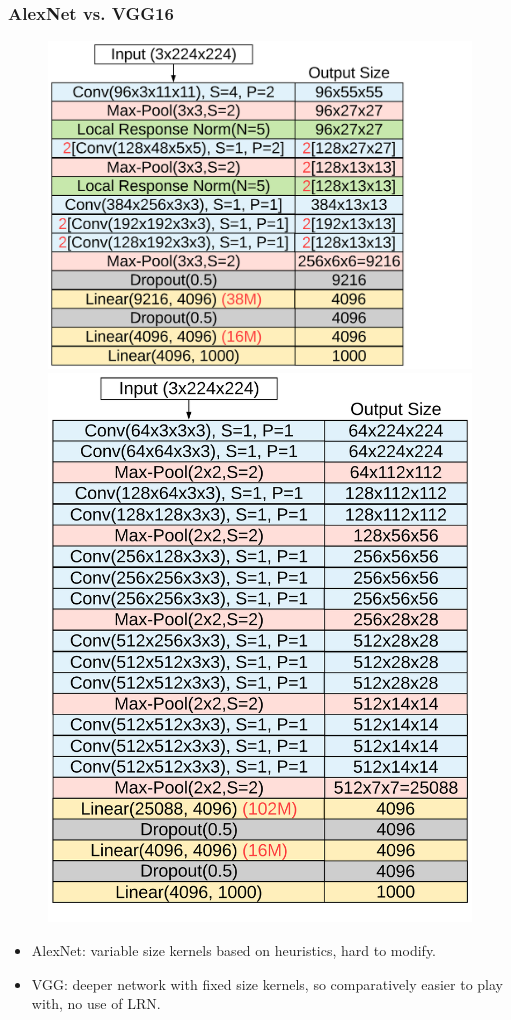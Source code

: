 \documentclass[9pt]{beamer}
\begin{document}
\begin{frame}
	\frametitle{AlexNet vs. VGG16}
		\begin{figure}[t]
			\includegraphics[scale=0.05]{./figures/edit/alexnet.png}
			\includegraphics[scale=0.05]{./figures/edit/vgg.png}
		\end{figure}	
		\pause	
		\begin{itemize}
			\item AlexNet: variable size kernels based on heuristics, hard to modify.
			\item VGG: deeper network with fixed size kernels, so comparatively easier to play with, no use of LRN.
		\end{itemize} 			
\end{frame}
\end{document}
